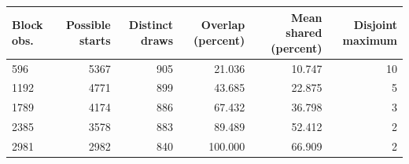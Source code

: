 \begin{tabular}{lrrrrr}
\toprule
Block obs. & Possible starts & Distinct draws & Overlap (percent) & Mean shared (percent) & Disjoint maximum \\
\midrule
596 & 5367 & 905 & 21.036 & 10.747 & 10 \\
1192 & 4771 & 899 & 43.685 & 22.875 &  5 \\
1789 & 4174 & 886 & 67.432 & 36.798 &  3 \\
2385 & 3578 & 883 & 89.489 & 52.412 &  2 \\
2981 & 2982 & 840 & 100.000 & 66.909 &  2 \\
\bottomrule
\end{tabular}
